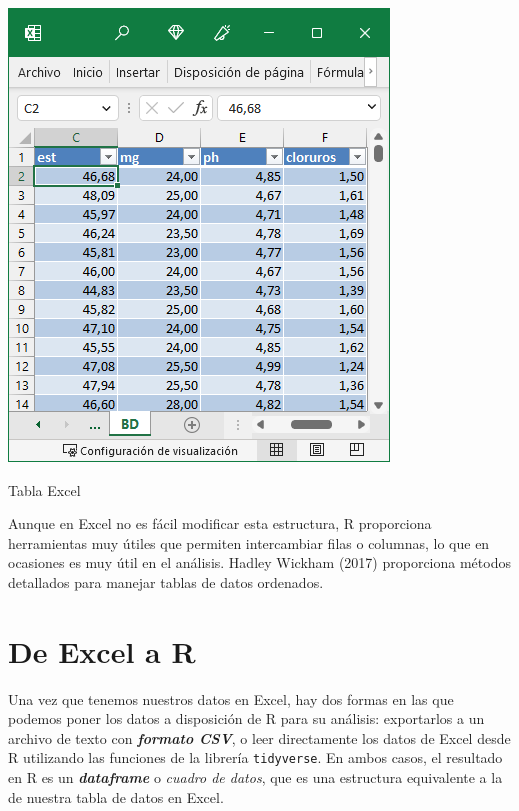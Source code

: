 \documentclass[
  letterpaper,
  DIV=11,
  numbers=noendperiod,
  oneside]{scrreprt}
\begin{document}
\begin{marginfigure}

{\centering \includegraphics{01-imagenes/2023-01-20-1.png}

}

\caption{Tabla Excel}

\end{marginfigure}

Aunque en Excel no es fácil modificar esta estructura, R proporciona
herramientas muy útiles que permiten intercambiar filas o columnas, lo
que en ocasiones es muy útil en el análisis. Hadley Wickham (2017)
proporciona métodos detallados para manejar tablas de datos ordenados.

\hypertarget{de-excel-a-r}{%
\section{De Excel a R}\label{de-excel-a-r}}

Una vez que tenemos nuestros datos en Excel, hay dos formas en las que
podemos poner los datos a disposición de R para su análisis: exportarlos
a un archivo de texto con \textbf{\emph{formato CSV}}, o leer
directamente los datos de Excel desde R utilizando las funciones de la
librería \texttt{tidyverse}. En ambos casos, el resultado en R es un
\textbf{\emph{dataframe}} o \emph{cuadro de datos}, que es una
estructura equivalente a la de nuestra tabla de datos en Excel.
\end{document}
